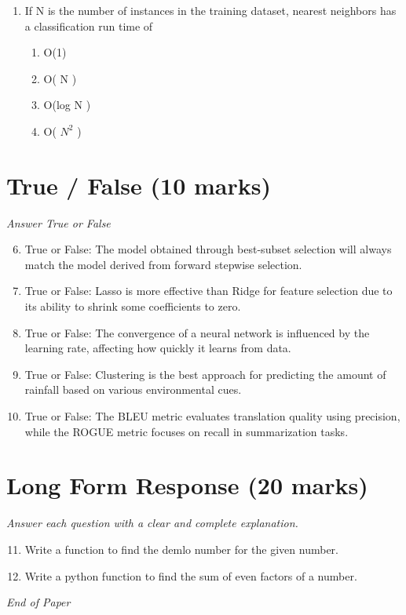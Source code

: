\documentclass[12pt]{article}
\begin{document}
\begin{enumerate}[label=\arabic*.]
\begin{enumerate}[label=(\alph*)]
    \item L$_{2}$ norm
    \item either (a) or (b)
\end{enumerate}
\item If N is the number of instances in the training dataset, nearest neighbors has a classification run time of
\begin{enumerate}[label=(\alph*)]
    \item O(1)
    \item O( N )
    \item O(log N )
    \item O( $N^2$ )
\end{enumerate}
\end{enumerate}

\section*{True / False (10 marks)}
\textit{Answer True or False}
\begin{enumerate}[label=\arabic*.]
\setcounter{enumi}{5}
\item True or False: The model obtained through best-subset selection will always match the model derived from forward stepwise selection.
\item True or False: Lasso is more effective than Ridge for feature selection due to its ability to shrink some coefficients to zero.
\item True or False: The convergence of a neural network is influenced by the learning rate, affecting how quickly it learns from data.
\item True or False: Clustering is the best approach for predicting the amount of rainfall based on various environmental cues.
\item True or False: The BLEU metric evaluates translation quality using precision, while the ROGUE metric focuses on recall in summarization tasks.
\end{enumerate}

\section*{Long Form Response (20 marks)}
\textit{Answer each question with a clear and complete explanation.}
\begin{enumerate}[label=\arabic*.]
\setcounter{enumi}{10}
\item Write a function to find the demlo number for the given number.
\item Write a python function to find the sum of even factors of a number.
\end{enumerate}

\vfill
\noindent\textit{End of Paper}
\end{document}
